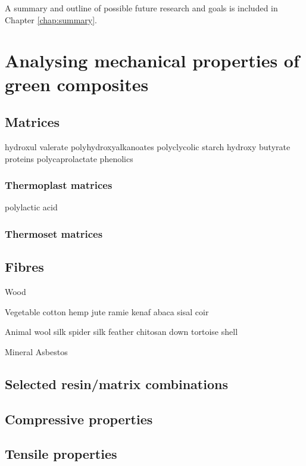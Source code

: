 \documentclass[]{report}
\begin{document}
A summary and outline of possible future research and goals is included in Chapter \ref{chap:summary}.


\chapter{Analysing mechanical properties of green composites}
\label{chap:properties}

\section{Matrices}
hydroxul valerate
polyhydroxyalkanoates
polyclycolic
starch
hydroxy butyrate
proteins
polycaprolactate
phenolics


\subsection{Thermoplast matrices}

polylactic acid



\subsection{Thermoset matrices}


\section{Fibres}

Wood

Vegetable
cotton
hemp
jute
ramie
kenaf
abaca
sisal
coir

Animal
wool
silk
spider silk
feather
chitosan
down
tortoise shell

Mineral
Asbestos


\section{Selected resin/matrix combinations}
\section{Compressive properties}
\section{Tensile properties}
\end{document}
